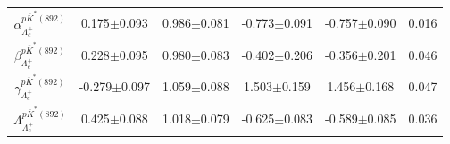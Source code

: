 \begin{table}[h]
{\begin{tabular}{cccccc}
            $\alpha_{\Lambda_c^+}^{p\overline{K}^*(892)}$ & 0.175$\pm$0.093 & 0.986$\pm$0.081 & -0.773$\pm$0.091 & -0.757$\pm$0.090 & 0.016\\
            $\beta_{\Lambda_c^+}^{p\overline{K}^*(892)}$ & 0.228$\pm$0.095 & 0.980$\pm$0.083 & -0.402$\pm$0.206 & -0.356$\pm$0.201 & 0.046\\
            $\gamma_{\Lambda_c^+}^{p\overline{K}^*(892)}$ & -0.279$\pm$0.097 & 1.059$\pm$0.088 & 1.503$\pm$0.159 & 1.456$\pm$0.168 & 0.047\\
            $\Lambda_{\Lambda_c^+}^{p\overline{K}^*(892)}$ & 0.425$\pm$0.088 & 1.018$\pm$0.079 & -0.625$\pm$0.083 & -0.589$\pm$0.085 & 0.036\\
        \hline\hline
        \end{tabular}
        }
\end{table}

\begin{table}[h]
    \caption{Fit results of pull distributions for amplitude magnitudes and phases of $e^+e^-\to\lcp\lcm$.}
    \label{tab:fit_io_full_sim_pull_gls}
\end{table}